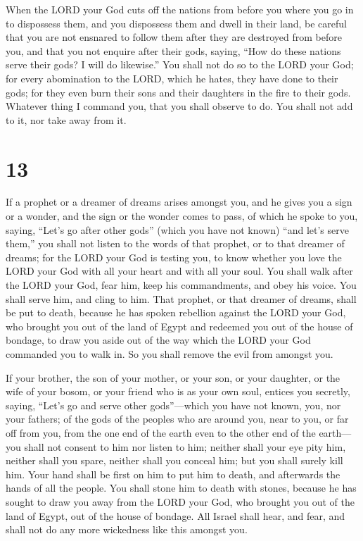  When the LORD your God cuts off the nations from before
you where you go in to dispossess them, and you dispossess them and
dwell in their land,  be careful that you are not
ensnared to follow them after they are destroyed from before you, and
that you not enquire after their gods, saying, ``How do these nations
serve their gods? I will do likewise.''  You shall not do
so to the LORD your God; for every abomination to the LORD, which he
hates, they have done to their gods; for they even burn their sons and
their daughters in the fire to their gods.  Whatever
thing I command you, that you shall observe to do. You shall not add to
it, nor take away from it.

\hypertarget{section-12}{%
\section{13}\label{section-12}}

 If a prophet or a dreamer of dreams arises amongst you,
and he gives you a sign or a wonder,  and the sign or the
wonder comes to pass, of which he spoke to you, saying, ``Let's go after
other gods'' (which you have not known) ``and let's serve them,''
 you shall not listen to the words of that prophet, or to
that dreamer of dreams; for the LORD your God is testing you, to know
whether you love the LORD your God with all your heart and with all your
soul.  You shall walk after the LORD your God, fear him,
keep his commandments, and obey his voice. You shall serve him, and
cling to him.  That prophet, or that dreamer of dreams,
shall be put to death, because he has spoken rebellion against the LORD
your God, who brought you out of the land of Egypt and redeemed you out
of the house of bondage, to draw you aside out of the way which the LORD
your God commanded you to walk in. So you shall remove the evil from
amongst you.

 If your brother, the son of your mother, or your son, or
your daughter, or the wife of your bosom, or your friend who is as your
own soul, entices you secretly, saying, ``Let's go and serve other
gods''---which you have not known, you, nor your fathers; 
of the gods of the peoples who are around you, near to you, or far off
from you, from the one end of the earth even to the other end of the
earth---  you shall not consent to him nor listen to him;
neither shall your eye pity him, neither shall you spare, neither shall
you conceal him;  but you shall surely kill him. Your hand
shall be first on him to put him to death, and afterwards the hands of
all the people.  You shall stone him to death with
stones, because he has sought to draw you away from the LORD your God,
who brought you out of the land of Egypt, out of the house of bondage.
 All Israel shall hear, and fear, and shall not do any
more wickedness like this amongst you.

